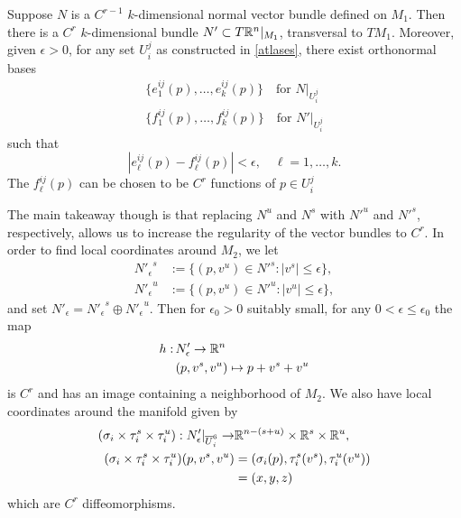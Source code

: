\begin{prop}
	Suppose \(N\) is a \(C^{r-1}\)  \(k\)-dimensional normal vector bundle defined on \(M_1\). Then there is a \(C^r\) \(k\)-dimensional bundle \(N'\subset T\mathbb{R}^n |_{M_1}\), transversal to \(TM_1\). Moreover, given \(\epsilon > 0\), for any set \(U^j_i\) as constructed in \cref{atlases}, there exist orthonormal bases 
	\begin{align}
		\{e^{ij}_1(p), \ldots, e^{ij}_k(p)\} \quad \text{for } N|_{U^j_i} \\
		\{f^{ij}_1(p), \ldots, f^{ij}_k(p)\} \quad \text{for } N'|_{U^j_i} 
	\end{align}
	such that
	\begin{equation}
		|e^{ij}_\ell(p) - f^{ij}_\ell(p) | < \epsilon, \quad \ell = 1,\ldots, k.
	\end{equation}
	The \(f^{ij}_\ell(p)\) can be chosen to be \(C^r\) functions of \(p \in U^j_i\)
\end{prop}
The main takeaway though is that replacing \(N^u\) and \(N^s\) with \({N'}^u\) and \({N'}^s\), respectively, allows us to increase the regularity of the vector bundles to \(C^r\). In order to find local coordinates around \(M_2\), we let 
\begin{align}
	{N'_\epsilon}^s &:= \{(p, v^u) \in {N'}^s: |v^s| \leq \epsilon\}, \\
	{N'_\epsilon}^ u&:= \{(p, v^u) \in {N'}^u: |v^u| \leq \epsilon\},
\end{align}
and set \(N'_\epsilon = {N'_\epsilon}^s \oplus {N'_\epsilon}^u\). Then for \(\epsilon_0>0\) suitably small, for any \(0< \epsilon \leq \epsilon_0\) the map
\begin{equation}
\begin{aligned}
	h:\, &N'_\epsilon  \to \mathbb{R}^n \\
	&(p, v^s, v^u) \mapsto p + v^s + v^u
\end{aligned}
\end{equation}
is \(C^r\) and has an image containing a neighborhood of \(M_2\). We also have local coordinates around the manifold given by
\begin{equation}
\begin{aligned}
	(\sigma_i \times \tau_i^s \times \tau_i^u) : N'_\epsilon |_{\overline U_i^6}  \to &\mathbb{R}^{n-(s+u)} \times \mathbb{R}^s \times \mathbb{R}^u, \\
	(\sigma_i \times \tau_i^s \times \tau_i^u) (p, v^s, v^u) &= (\sigma_i(p), \tau_i^s(v^s), \tau_i^u(v^u)) \\
	&= (x,y,z)
\end{aligned}
\end{equation}
which are \(C^r\) diffeomorphisms.

